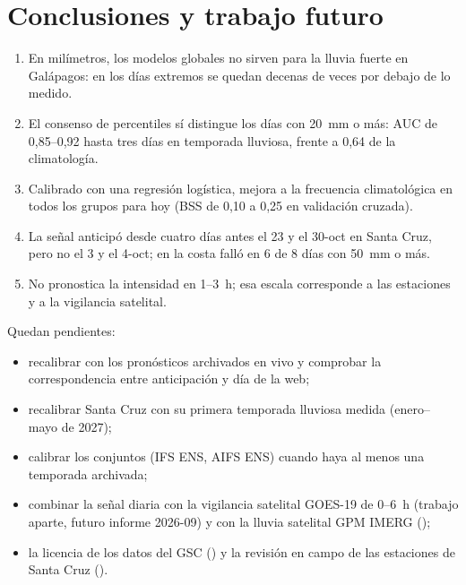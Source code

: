 \documentclass{sosg-informe}
\begin{document}
\section{Conclusiones y trabajo futuro}
\begin{enumerate}
  \item En milímetros, los modelos globales no sirven para la lluvia fuerte en Galápagos: en los días extremos se quedan decenas de veces por debajo de lo medido.
  \item El consenso de percentiles sí distingue los días con 20~mm o más: AUC de 0,85--0,92 hasta tres días en temporada lluviosa, frente a 0,64 de la climatología.
  \item Calibrado con una regresión logística, mejora a la frecuencia climatológica en todos los grupos para hoy (BSS de 0,10 a 0,25 en validación cruzada).
  \item La señal anticipó desde cuatro días antes el 23 y el 30-oct en Santa Cruz, pero no el 3 y el 4-oct; en la costa falló en 6 de 8 días con 50~mm o más.
  \item No pronostica la intensidad en 1--3~h; esa escala corresponde a las estaciones y a la vigilancia satelital.
\end{enumerate}

Quedan pendientes:
\begin{itemize}
  \item recalibrar con los pronósticos archivados en vivo y comprobar la correspondencia entre anticipación y día de la web;
  \item recalibrar Santa Cruz con su primera temporada lluviosa medida (enero--mayo de 2027);
  \item calibrar los conjuntos (IFS ENS, AIFS ENS) cuando haya al menos una temporada archivada;
  \item combinar la señal diaria con la vigilancia satelital GOES-19 de 0--6~h (trabajo aparte, futuro informe 2026-09) y con la lluvia satelital GPM IMERG ();
  \item la licencia de los datos del GSC () y la revisión en campo de las estaciones de Santa Cruz ().
\end{itemize}
\end{document}
